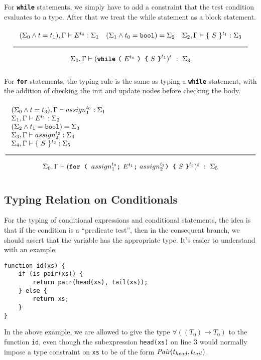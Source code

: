 \noindent
For \textbf{\texttt{while}} statements, we simply have to add a constraint that the test condition evaluates to a \Bool \texttt{} type. After that we treat the while statement as a block statement.
\[\Rule{(\Sigma_0 \wedge t = t_1),
          \Gamma \vdash E^{t_0} : \Sigma_1 \quad
          (\Sigma_1 \wedge t_0 = \Bool) = \Sigma_2 \quad
\Sigma_2, \Gamma \vdash \{\ S\ \}^{t_1} : \Sigma_3 }{
  \Sigma_0, \Gamma \vdash (\textbf{\texttt{while}}\ \texttt{(}\ E^{t_0}\ \texttt{)\ \{}\ S\ \texttt{\}}^{t_1})^t\ :\ \Sigma_3}
\]

\noindent
For \textbf{\texttt{for}} statements, the typing rule is the same as typing a \textbf{\texttt{while}}
statement, with the addition of checking the init and update nodes before checking the body.
\[
  \Rule{
    \begin{minipage}{120mm}
      $(\Sigma_0 \wedge t = t_3),
                \Gamma \vdash assign_1^{t_0} : \Sigma_1 $\\
      $\Sigma_1, \Gamma \vdash E^{t_1} : \Sigma_2$ \\
      $(\Sigma_2 \wedge t_1 = \Bool) = \Sigma_3$\\
      $\Sigma_3, \Gamma \vdash assign_2^{t_2} : \Sigma_4$\\
      $\Sigma_4, \Gamma \vdash \{\ S\ \}^{t_3} : \Sigma_5 $
    \end{minipage}}{
  \Sigma_0, \Gamma \vdash (\textbf{\texttt{for }} \texttt{( }assign_1^{t_0}\texttt{;}\ E^{t_1}\texttt{;}\ assign_2^{t_2}\texttt{) \{}\ S\ \texttt{\}}^{t_3})^t\ :\ \Sigma_5}
\]


\subsection{Typing Relation on Conditionals}

For the typing of conditional expressions and conditional statements,
the idea is that if the condition is a ``predicate test'',
then in the consequent branch, we should assert that the variable has the appropriate type.
It's easier to understand with an example:

\begin{lstlisting}
function id(xs) {
    if (is_pair(xs)) {
        return pair(head(xs), tail(xs));
    } else {
        return xs;
    }
}
\end{lstlisting}

In the above example,
we are allowed to give the type $\forall((T_0) \to T_0)$ to the function \texttt{id},
even though the subexpression \texttt{head(xs)} on line 3
would normally impose a type constraint on \texttt{xs}
to be of the form $\textit{Pair}(t_{head}, t_{tail})$.

